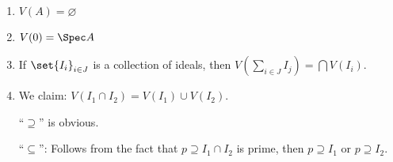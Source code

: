 \begin{enumerate}
	\item $V(A) = \varnothing$
	\item $V(0) = \Spec A$
	\item If $\set{I_i}_{i \in J}$ is a collection of ideals, then
		$V(\sum_{i \in J} I_j) = \bigcap V(I_i)$.
	\item We claim: $V(I_1 \cap I_2) = V(I_1) \cup V(I_2)$.

		\enquote{$\supseteq$} is obvious.

		\enquote{$\subseteq$}: Follows from the fact that $p\supseteq I_1\cap I_2$ is prime, then
		$p\supseteq I_1$ or $p\supseteq I_2$.
\end{enumerate}
